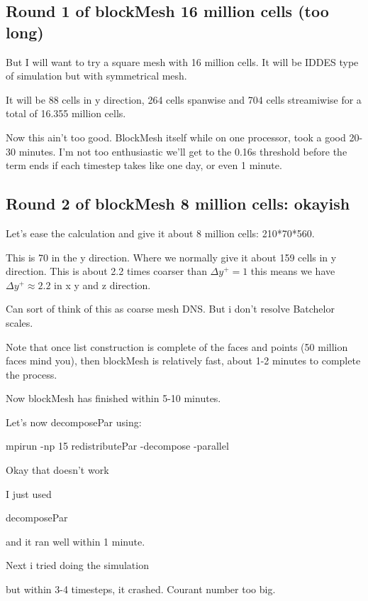 \documentclass[12pt]{article}
\renewcommand{\_}{\kern-1.5pt\textunderscore\kern-1.5pt}
\begin{document}
\subsection{Round 1 of blockMesh 16 million cells (too long)}


But I will want to try a square mesh with 16 million cells. It will be IDDES type of simulation but with symmetrical mesh.


It will be 88 cells in y direction, 264 cells spanwise and 704 cells streamiwise for a total of 16.355 million cells.



Now this ain't too good. BlockMesh itself while on one processor, took a good 20-30 minutes. I'm not too enthusiastic we'll get to the 0.16s threshold before the term ends if each timestep takes like one day, or even 1 minute.

\subsection{Round 2 of blockMesh 8 million cells: okayish}

Let's ease the calculation and give it about 8 million cells:
210*70*560.

This is 70 in the y direction. Where we normally give it about 159 cells in y direction. This is about 2.2 times coarser than $\Delta {y}^{+} = 1$ this means we have $\Delta {y}^{+} \approx  2.2$ in x y and z direction.


Can sort of think of this as coarse mesh DNS. But i don't resolve Batchelor scales.



Note that once list construction is complete of the faces and points (50 million faces mind you), then blockMesh is relatively fast, about 1-2 minutes to complete the process.


Now blockMesh has finished within 5-10 minutes.


Let's now decomposePar using:


mpirun -np 15 redistributePar -decompose -parallel 


Okay that doesn't work



I just used 


decomposePar


and it ran well within 1 minute.



Next i tried doing the simulation


but within 3-4 timesteps, it crashed. Courant number too big.
\end{document}
